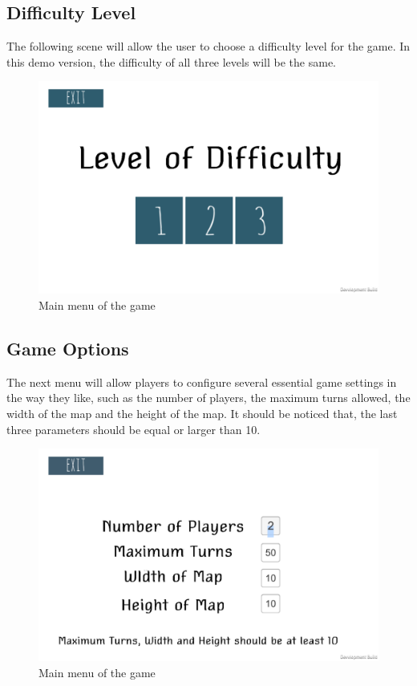 \documentclass[12pt,a4paper]{scrartcl}
\begin{document}
\subsection{Difficulty Level}
The following scene will allow the user to choose a difficulty level for the game. In this demo version, the difficulty of all three levels will be the same.
\begin{figure}[h] 
	\centering
	\includegraphics[scale=0.2]{start2}
	\caption{Main menu of the game}
\end{figure}

\subsection{Game Options}
The next menu will allow players to configure several essential game settings in the way they like, such as the number of players, the maximum turns allowed, the width of the map and the height of the map. It should be noticed that, the last three parameters should be equal or larger than 10.

\begin{figure}[h] 
	\centering
	\includegraphics[scale=0.2]{start3}
	\caption{Main menu of the game}
\end{figure}
\end{document}
